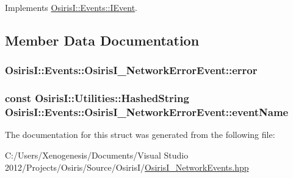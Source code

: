 Implements \hyperlink{struct_osiris_i_1_1_events_1_1_i_event_afb77e9812899e26563a5ee131c4c5d29}{Osiris\-I\-::\-Events\-::\-I\-Event}.



\subsection{Member Data Documentation}
\hypertarget{struct_osiris_i_1_1_events_1_1_osiris_i___network_error_event_a6a05c912c272bd233fcfad27c134f18a}{
\subsubsection[{error}]{ Osiris\-I\-::\-Events\-::\-Osiris\-I\-\_\-\-Network\-Error\-Event\-::error\hspace{0.3cm}{\ttfamily [protected]}}}\label{struct_osiris_i_1_1_events_1_1_osiris_i___network_error_event_a6a05c912c272bd233fcfad27c134f18a}
\hypertarget{struct_osiris_i_1_1_events_1_1_osiris_i___network_error_event_a2763c379c2516e7c67970fb20ebc5dd8}{
\subsubsection[{event\-Name}]{\setlength{\rightskip}{0pt plus 5cm}const {\bf Osiris\-I\-::\-Utilities\-::\-Hashed\-String} Osiris\-I\-::\-Events\-::\-Osiris\-I\-\_\-\-Network\-Error\-Event\-::event\-Name\hspace{0.3cm}{\ttfamily [static]}}}\label{struct_osiris_i_1_1_events_1_1_osiris_i___network_error_event_a2763c379c2516e7c67970fb20ebc5dd8}


The documentation for this struct was generated from the following file\-:\begin{DoxyCompactItemize}
\item 
C\-:/\-Users/\-Xenogenesis/\-Documents/\-Visual Studio 2012/\-Projects/\-Osiris/\-Source/\-Osiris\-I/\hyperlink{_osiris_i___network_events_8hpp}{Osiris\-I\-\_\-\-Network\-Events.\-hpp}\end{DoxyCompactItemize}
